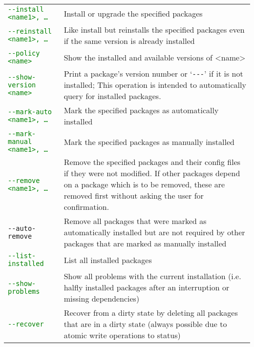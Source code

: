 \documentclass[a4paper]{article}
\newcommand{\green}[1]{\textcolor{green}{#1}}
\begin{document}
	\bgroup
	\def\arraystretch{1.5}
	\begin{tabularx}{\textwidth}{lX}
		\green{\texttt{-{}-install <name1>, \dots}} & Install or upgrade the specified packages \\
		
		\green{\texttt{-{}-reinstall <name1>, \dots}} & Like install but reinstalls the specified packages even if the same version is already installed \\
		
		\green{\texttt{-{}-policy <name>}} & Show the installed and available versions of <name> \\
		
		\green{\texttt{-{}-show-version <name>}} & Print a package's version number or `\texttt{-{}-{}-}' if it is not installed; This operation is intended to automatically query for installed packages. \\
		
		\green{\texttt{-{}-mark-auto <name1>, \dots}} & Mark the specified packages as automatically installed \\
		
		\green{\texttt{-{}-mark-manual <name1>, \dots}} & Mark the specified packages as manually installed \\
		
		\green{\texttt{-{}-remove <name1>, \dots}} & Remove the specified packages and their config files if they were not modified. If other packages depend on a package which is to be removed, these are removed first without asking the user for confirmation. \\
		
		\texttt{-{}-auto-remove} & Remove all packages that were marked as automatically installed but are not required by other packages that are marked as manually installed \\
		
		\green{\texttt{-{}-list-installed}} & List all installed packages \\
		
		\green{\texttt{-{}-show-problems}} & Show all problems with the current installation (i.e. halfly installed packages after an interruption or missing dependencies) \\
		
		\green{\texttt{-{}-recover}} & Recover from a dirty state by deleting all packages that are in a dirty state (always possible due to atomic write operations to status) \\
		

\end{tabularx}
\end{document}
